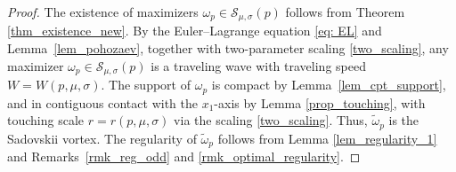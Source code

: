 \documentclass[10pt,a4paper]{amsart}
\theoremstyle{definition}
\theoremstyle{definition}
\numberwithin{equation}{section}
\newcommand{\tld}[1]{\widetilde{#1}}
\newcommand{\0}{\emptyset}
\newcommand{\calS}{\mathcal S}
\begin{document}
\setcounter{section}{6}
\setcounter{equation}{4}
\setcounter{theorem}{1}
			\begin{proof}
				The existence of maximizers $\omega_p\in \calS_{\mu,\sigma}(p)$ follows from Theorem \ref{thm_existence_new}.
                By the Euler--Lagrange equation \eqref{eq: EL} and Lemma~\ref{lem_pohozaev}, together with two-parameter scaling \eqref{two_scaling}, any maximizer $\omega_p \in \calS_{\mu,\sigma}(p)$ is a traveling wave with traveling speed $W = W(p, \mu, \sigma)$.
				The support of $\omega_p$ is compact by Lemma~\ref{lem_cpt_support}, and in contiguous contact with the $x_1$-axis by Lemma \ref{prop_touching}, with touching scale $r = r(p, \mu, \sigma)$ via the scaling \eqref{two_scaling}.
                Thus, $\tld{\omega}_p$ is the Sadovskii vortex.
                The regularity of $\tld{\omega}_p$ follows from Lemma \ref{lem_regularity_1} and Remarks~\ref{rmk_reg_odd} and \ref{rmk_optimal_regularity}.
				

\end{proof}
\end{document}
